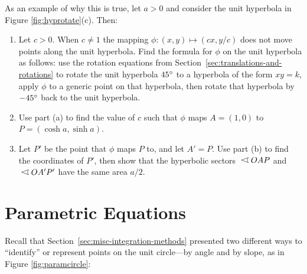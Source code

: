{\begin{enumerate}[\bfseries 1.]
\noindent As an example of why this is true, let $a>0$ and consider the unit
hyperbola in Figure \ref{fig:hyprotate}(c). Then:
 \begin{enumerate}[\bfseries (a)]
  \item Let $c>0$. When $c \ne 1$ the mapping $\phi: (x,y) \mapsto (cx,y/c)$
   does not move points along the unit hyperbola. Find the formula for $\phi$ on
   the unit hyperbola as follows:
   use the rotation equations from Section~\ref{sec:translations-and-rotations} to rotate the
   unit hyperbola $45^\circ$ to a hyperbola of the form $xy=k$, apply
   $\phi$ to a generic point on that hyperbola, then rotate that
   hyperbola by $-45^\circ$ back to the unit hyperbola.
  \item Use part (a) to find the value of $c$ such that $\phi$ maps
   $A=(1,0)$ to $P=(\cosh a,\sinh a)$.
  \item Let $P'$ be the point that $\phi$ maps $P$ to, and let $A'=P$. Use part
   (b) to find the coordinates of $P'$, then show that the hyperbolic sectors
   $\;\hypsector\;OAP$ and $\;\hypsector\;OA'P'$ have the same area $a/2$.
 \end{enumerate}
\end{enumerate}
}
\newpage
\section{Parametric Equations}\label{sec:parametric-equations}
Recall that Section~\ref{sec:misc-integration-methods} presented two different ways to ``identify'' or
represent points on the unit circle---by angle and by slope, as in Figure
\ref{fig:paramcircle}:

